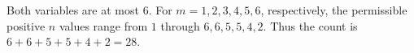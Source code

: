 Both variables are at most $6$. For $m=1,2,3,4,5,6$, respectively, the permissible positive $n$ values range from $1$ through $6,6,5,5,4,2$. Thus the count is $6+6+5+5+4+2=\boxed{28}$.
